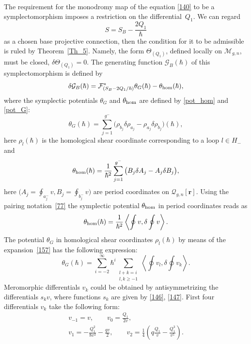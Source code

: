 \documentclass[pdftex]{sigma}
\numberwithin{equation}{section}
\theoremstyle{definition}
\begin{document}
The requirement for the monodromy map of the equation \eqref{140} to be a symplectomorphism imposes a restriction on the differential~$Q_1$. We can regard
\begin{equation*}
S=S_B-\frac{2Q_1}{\hbar}
\end{equation*} as a chosen base projective connection, then the condition for it to be admissible is ruled by Theorem~\ref{Th_5}. Namely, the form $\Theta_{(Q_1)}$, defined locally on $\mathcal{M}_{g,n}$, must be closed, $\delta\Theta_{(Q_1)}=0$.
The generating function $\mathcal{G}_B(\hbar)$ of this symplectomorphism is defined by
 \begin{equation} \label{yang_wkb}
 \delta \mathcal{G}_{B}(\hbar)=\mathcal{F}_{(S_B-{2Q_1}/{\hbar})}^*\theta_{G}(\hbar)-\theta_{{\rm hom}}(\hbar), \end{equation}
 where the symplectic potentials $\theta_G$ and $\theta_{{\rm hom}}$ are defined by \eqref{pot_hom} and \eqref{pot_G}:
\begin{equation} \label{pot_G_wkb}
 \theta_{G}(\hbar)=\sum^{g^-}_{j=1} \big(\rho_{b_j} \delta \rho_{a_j} - \rho_{a_j} \delta \rho_{b_j} \big)(\hbar),
 \end{equation}
 here $\rho_l(\hbar)$ is the homological shear coordinate corresponding to a loop $l \in H_{-}$ and
 \begin{equation}\label{pot_hom_wkb}\theta_{{\rm hom}}(\hbar)=\frac{1}{\hbar^2}\sum^{g^-}_{j=1} \big( B_j \delta A_j - A_j \delta B_j \big),\end{equation}
 here $\big(A_j=\oint_{a^-_j}v, B_j=\oint_{b^-_j}v\big)$ are period coordinates on $\mathcal{Q}_{g,n}[\mathbf{r}]$.
Using the pairing notation~\eqref{77} the symplectic potential $\theta_{{\rm hom}}$ in period coordinates reads as
\begin{equation*}%
\theta_{{\rm hom}}(\hbar)=\frac{1}{\hbar^2}\left\langle \oint v,\delta \oint v\right\rangle .
\end{equation*}
The potential $\theta_G$
in homological shear coordinates $\rho_{l}(\hbar)$ by means of the expansion~\eqref{157} has the following expression:
\begin{equation}\label{160}
\theta_{G}(\hbar)=\sum^{\infty}_{i=-2}\hbar^i \sum_{\substack {l+k=i \\ l,k\geq -1}}\left\langle \oint v_l, \delta \oint v_k \right\rangle. \end{equation}
Meromorphic differentials $v_k$ could be obtained by antisymmetrizing the differentials $s_k v$, where functions $s_k$ are given by \eqref{146}, \eqref{147}. First four differentials $v_k$ take the following form:
\begin{gather} \label{163}
v_{-1}=v, \qquad v_0=\frac{Q_1}{2v},
\\
\label{164}
v_1=-\frac{Q^2_1}{8v^3}-\frac{qv}{2}, \qquad v_2=\frac{1}{4} \left(q\frac{Q_1}{v}-\frac{Q^3_1}{v^5}\right).
\end{gather}
\end{document}
